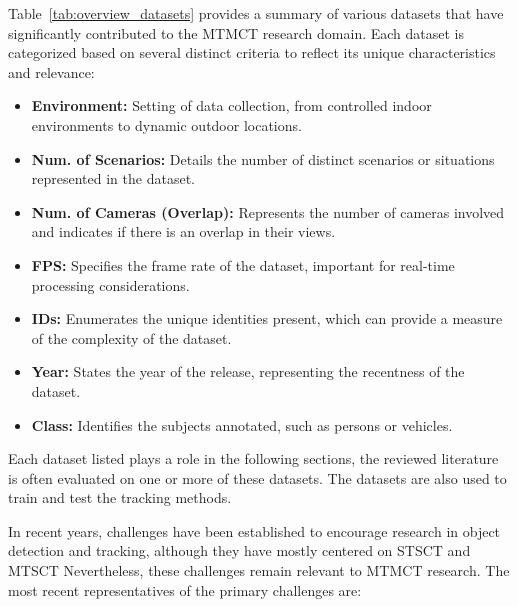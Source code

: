 
Table~\ref{tab:overview_datasets} provides a summary of various datasets that have significantly contributed to the MTMCT research domain. Each dataset is categorized based on several distinct criteria to reflect its unique characteristics and relevance:

\begin{itemize}
    \item \textbf{Environment:} Setting of data collection, from controlled indoor environments to dynamic outdoor locations.
    \item \textbf{Num. of Scenarios:} Details the number of distinct scenarios or situations represented in the dataset.
    \item \textbf{Num. of Cameras (Overlap):} Represents the number of cameras involved and indicates if there is an overlap in their views.
    \item \textbf{FPS:} Specifies the frame rate of the dataset, important for real-time processing considerations.
    \item \textbf{IDs:} Enumerates the unique identities present, which can provide a measure of the complexity of the dataset.
    \item \textbf{Year:} States the year of the release, representing the recentness of the dataset.
    \item \textbf{Class:} Identifies the subjects annotated, such as persons or vehicles.
\end{itemize}

Each dataset listed plays a role in the following sections, the reviewed literature is often evaluated on one or more of these datasets. The datasets are also used to train and test the tracking methods.

In recent years, challenges have been established to encourage research in object detection and tracking, although they have mostly centered on STSCT and MTSCT Nevertheless, these challenges remain relevant to MTMCT research. The most recent representatives of the primary challenges are:

